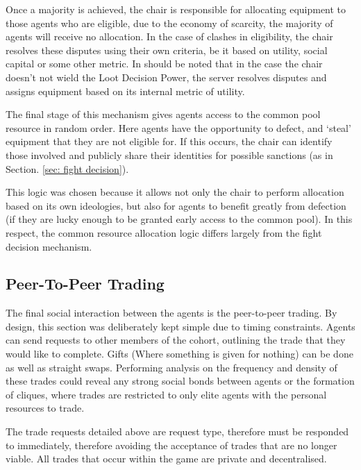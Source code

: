 Once a majority is achieved, the chair is responsible for allocating equipment to those agents who are eligible, due to the economy of scarcity, the majority of agents will receive no allocation. In the case of clashes in eligibility, the chair resolves these disputes using their own criteria, be it based on utility, social capital or some other metric. In should be noted that in the case the chair doesn't not wield the Loot Decision Power, the server resolves disputes and assigns equipment based on its internal metric of utility. 

The final stage of this mechanism gives agents access to the common pool resource in random order. Here agents have the opportunity to defect, and `steal' equipment that they are not eligible for. If this occurs, the chair can identify those involved and publicly share their identities for possible sanctions (as in Section. \ref{sec: fight decision}). 

This logic was chosen because it allows not only the chair to perform allocation based on its own ideologies, but also for agents to benefit greatly from defection (if they are lucky enough to be granted early access to the common pool). In this respect, the common resource allocation logic differs largely from the fight decision mechanism. 

\subsection{Peer-To-Peer Trading}\label{sec: trading}


The final social interaction between the agents is the peer-to-peer trading. By design, this section was deliberately kept simple due to timing constraints. Agents can send requests to other members of the cohort, outlining the trade that they would like to complete. Gifts (Where something is given for nothing) can be done as well as straight swaps. Performing analysis on the frequency and density of these trades could reveal any strong social bonds between agents or the formation of cliques, where trades are restricted to only elite agents with the personal resources to trade. 

The trade requests detailed above are request type, therefore must be responded to immediately, therefore avoiding the acceptance of trades that are no longer viable. All trades that occur within the game are private and decentralised. 


